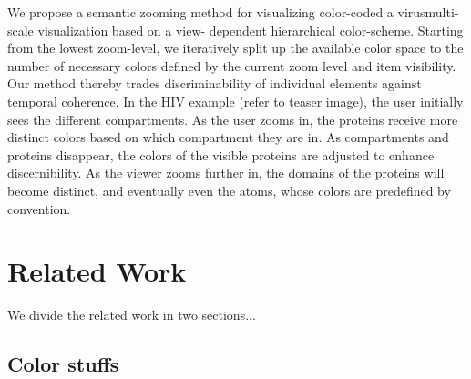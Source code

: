 \documentclass[review,journal]{vgtc}         %
\begin{document}
We propose a semantic zooming method for visualizing color-coded a virusmulti-scale visualization based on a view- dependent hierarchical color-scheme. 
Starting from the lowest zoom-level, we iteratively split up the available color space to the number of necessary colors defined by the current zoom level and item visibility.
 Our method thereby trades discriminability of individual elements against temporal coherence. 
In the HIV example (refer to teaser image), the user initially sees the different compartments. 
As the user zooms in, the proteins receive more distinct colors based on which compartment they are in. As compartments and proteins disappear, the colors of the visible proteins are adjusted to enhance discernibility.  
As the viewer zooms further in, the domains of the proteins will become distinct, and eventually even the atoms, whose colors are predefined by convention. 

\section{Related Work}

We divide the related work in two sections...

\subsection{Color stuffs}
\end{document}
